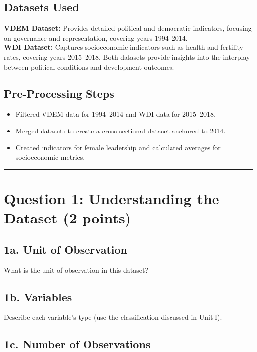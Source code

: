 \documentclass[a4paper, 11pt]{article}
\begin{document}
\normalsize

\subsection*{Datasets Used}
\textbf{VDEM Dataset:} Provides detailed political and democratic indicators, focusing on governance and representation, covering years 1994–2014. \\
\textbf{WDI Dataset:} Captures socioeconomic indicators such as health and fertility rates, covering years 2015–2018. Both datasets provide insights into the interplay between political conditions and development outcomes.

\subsection*{Pre-Processing Steps}
\begin{itemize}
    \item Filtered VDEM data for 1994–2014 and WDI data for 2015–2018.
    \item Merged datasets to create a cross-sectional dataset anchored to 2014.
    \item Created indicators for female leadership and calculated averages for socioeconomic metrics.
\end{itemize}

\rule{\linewidth}{0.4pt}

\section*{Question 1: Understanding the Dataset (2 points)}

\subsection*{1a. Unit of Observation}

What is the unit of observation in this dataset?

\subsection*{1b. Variables}

Describe each variable's type (use the classification discussed in Unit I).

\subsection*{1c. Number of Observations}
\end{document}
